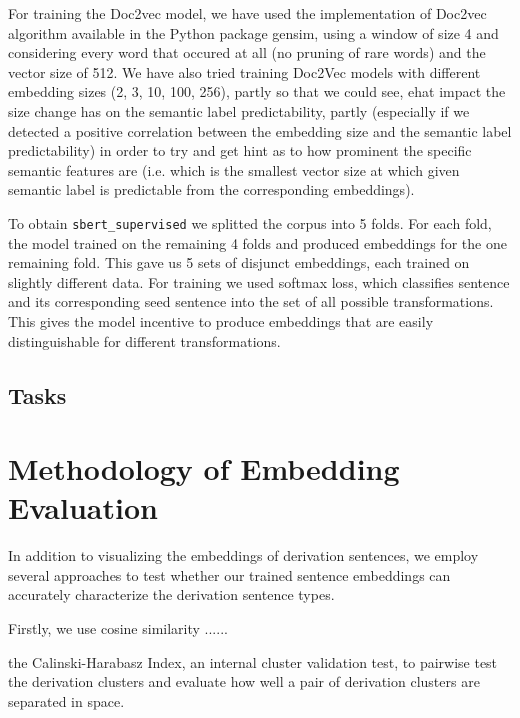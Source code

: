 \documentclass[11pt]{article}
\newcommand{\Embed}[1]{\texttt{#1}}
\begin{document}
For training the Doc2vec model, we have used the implementation of Doc2vec algorithm
available in the Python package gensim, using a window of size 4 and considering every
word that occured at all (no pruning of rare words) and the vector size of 512.
We have also tried training Doc2Vec models with different embedding sizes (2, 3, 10, 100, 256),
partly so that we could see, ehat impact the size change has on the semantic label predictability, 
partly (especially if we detected a positive correlation between the embedding size and the semantic label
predictability) in order to try and get hint as to how prominent the specific semantic features are 
(i.e. which is the smallest vector size at which given semantic label is predictable from the corresponding embeddings).


To obtain \Embed{sbert\_supervised} we splitted the corpus into 5 folds. For
each fold, the model trained on the remaining 4 folds and produced embeddings
for the one remaining fold. This gave us 5 sets of disjunct embeddings, each
trained on slightly different data. For training we used softmax loss, which
classifies sentence and its corresponding seed sentence into the set of all
possible transformations. This gives the model incentive to produce embeddings
that are easily distinguishable for different transformations.


\subsection{Tasks}






\section{Methodology of Embedding Evaluation}


In addition to visualizing the embeddings of derivation sentences, we employ several approaches to test whether our trained sentence embeddings can accurately characterize the derivation sentence types.




Firstly, we use cosine similarity ......


the Calinski-Harabasz Index, an internal cluster validation test, to pairwise test the derivation clusters and evaluate how well a pair of derivation clusters are separated in space.
\end{document}
